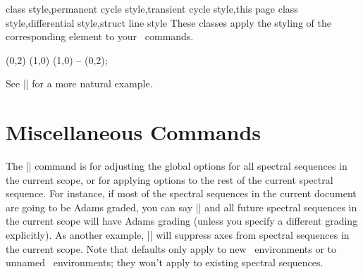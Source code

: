 \begin{sseqdata}[|| name = ex1, cohomological Serre grading]
\begin{keylist}{class style,permanent cycle style,transient cycle style,this page class style,differential style,struct line style}
These classes apply the styling of the corresponding element to your \tikzpkg\  commands.
\begin{codeexample}[width = 6cm]
\begin{sseqpage}[ differentials = blue, yscale = 0.65, no axes ]
\class(0,2)
\class(1,0)
 (1,0) -- (0,2);
\end{sseqpage}
\end{codeexample}
See |\getdtarget| for a more natural example.
\end{keylist}



\section{Miscellaneous Commands}
\begin{command}{\sseqset{}}
The |\sseqset| command is for adjusting the global options for all spectral sequences in the current scope, or for applying options to the rest of the current spectral sequence. For instance, if most of the spectral sequences in the current document are going to be Adams graded, you can say || and all future spectral sequences in the current scope will have Adams grading (unless you specify a different grading explicitly). As another example, || will suppress axes from spectral sequences in the current scope. Note that defaults only apply to new \sseqdataenv\ environments or to unnamed \sseqpageenv\ environments; they won't apply to existing spectral sequences.


\end{command}
\end{sseqdata}
